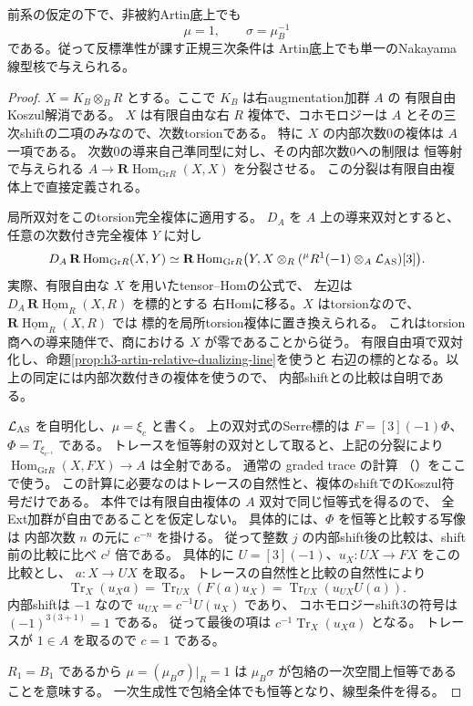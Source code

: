 \begin{theorem}\label{thm:h3-artin-relative-nakayama-trivial}
前系の仮定の下で、非被約Artin底上でも
\[
 \mu=1,\qquad \sigma=\mu_B^{-1}
\]
である。従って反標準性が課す正規三次条件は
Artin底上でも単一のNakayama線型核で与えられる。
\end{theorem}
\begin{proof}
$X=K_B\otimes_B R$ とする。ここで $K_B$ は右augmentation加群 $A$ の
有限自由Koszul解消である。
$X$ は有限自由な右 $R$ 複体で、コホモロジーは
$A$ とその三次shiftの二項のみなので、次数torsionである。
特に $X$ の内部次数0の複体は $A$ 一項である。
次数0の導来自己準同型に対し、その内部次数0への制限は
恒等射で与えられる $A\to\mathbf R\operatorname{Hom}_{\mathrm{Gr}R}(X,X)$ を分裂させる。
この分裂は有限自由複体上で直接定義される。

局所双対をこのtorsion完全複体に適用する。
$D_A$ を $A$ 上の導来双対とすると、任意の次数付き完全複体 $Y$ に対し
\[
 D_A\,\mathbf R\operatorname{Hom}_{\mathrm{Gr}R}(X,Y)
 \simeq
 \mathbf R\operatorname{Hom}_{\mathrm{Gr}R}
   \bigl(Y,X\otimes_R({}^{\mu}R^1(-1)\otimes_A\mathcal L_{\rm AS})[3]\bigr).
\]
実際、有限自由な $X$ を用いたtensor--Homの公式で、
左辺は $D_A\,\mathbf R\underline{\operatorname{Hom}}_R(X,R)$ を標的とする
右Homに移る。$X$ はtorsionなので、
$\mathbf R\underline{\operatorname{Hom}}_R(X,R)$ では
標的を局所torsion複体に置き換えられる。
これはtorsion商への導来随伴で、商における $X$ が零であることから従う。
有限自由項で双対化し、命題\ref{prop:h3-artin-relative-dualizing-line}を使うと
右辺の標的となる。以上の同定には内部次数付きの複体を使うので、
内部shiftとの比較は自明である。

$\mathcal L_{\rm AS}$ を自明化し、$\mu=\xi_c$ と書く。
上の双対式のSerre標的は $F=[3](-1)\Phi$、$\Phi=T_{\xi_{c^{-1}}}$ である。
トレースを恒等射の双対として取ると、上記の分裂により
$\operatorname{Hom}_{\mathrm{Gr}R}(X,FX)\to A$ は全射である。
通常の graded trace の計算
（\cite[Lemma 2.6, Theorem 4.1の証明]{RRZtri}）をここで使う。
この計算に必要なのはトレースの自然性と、複体のshiftでのKoszul符号だけである。
本件では有限自由複体の $A$ 双対で同じ恒等式を得るので、
全Ext加群が自由であることを仮定しない。
具体的には、$\Phi$ を恒等と比較する写像は
内部次数 $n$ の元に $c^{-n}$ を掛ける。
従って整数 $j$ の内部shift後の比較は、shift前の比較に比べ $c^j$ 倍である。
具体的に $U=[3](-1)$、$u_X:UX\to FX$ をこの比較とし、
$a:X\to UX$ を取る。
トレースの自然性と比較の自然性により
\[
 \operatorname{Tr}_X(u_Xa)
 =\operatorname{Tr}_{UX}(F(a)u_X)
 =\operatorname{Tr}_{UX}(u_{UX}U(a)).
\]
内部shiftは $-1$ なので $u_{UX}=c^{-1}U(u_X)$ であり、
コホモロジーshift3の符号は $(-1)^{3(3+1)}=1$ である。
従って最後の項は $c^{-1}\operatorname{Tr}_X(u_Xa)$ となる。
トレースが $1\in A$ を取るので $c=1$ である。

$R_1=B_1$ であるから $\mu=(\mu_B\sigma)|_R=1$ は
$\mu_B\sigma$ が包絡の一次空間上恒等であることを意味する。
一次生成性で包絡全体でも恒等となり、線型条件を得る。
\end{proof}


